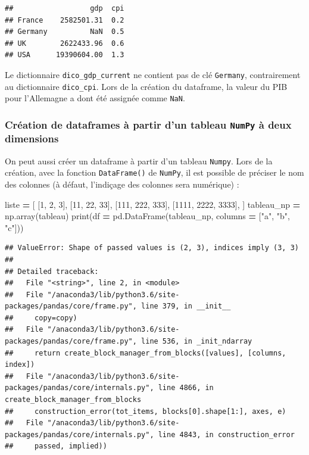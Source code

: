 \documentclass[12pt,]{book}
\newenvironment{Shaded}{\begin{snugshade}}{\end{snugshade}}
\newcommand{\DecValTok}[1]{\textcolor[rgb]{0.00,0.00,0.81}{#1}}
\newcommand{\StringTok}[1]{\textcolor[rgb]{0.31,0.60,0.02}{#1}}
\newcommand{\OperatorTok}[1]{\textcolor[rgb]{0.81,0.36,0.00}{\textbf{#1}}}
\newcommand{\BuiltInTok}[1]{#1}
\newcommand{\NormalTok}[1]{#1}
\numberwithin{equation}{section}
\numberwithin{countremarque}{section}
\let\BeginKnitrBlock\begin \let\EndKnitrBlock\end
\begin{document}
\begin{lstlisting}
##                  gdp  cpi
## France    2582501.31  0.2
## Germany          NaN  0.5
## UK        2622433.96  0.6
## USA      19390604.00  1.3
\end{lstlisting}

\BeginKnitrBlock{remarque}
Le dictionnaire \texttt{dico\_gdp\_current} ne contient pas de clé
\texttt{Germany}, contrairement au dictionnaire \texttt{dico\_cpi}. Lors
de la création du dataframe, la valeur du PIB pour l'Allemagne a dont
été assignée comme \texttt{NaN}.
\EndKnitrBlock{remarque}

\subsubsection{\texorpdfstring{Création de dataframes à partir d'un
tableau \texttt{NumPy} à deux
dimensions}{Création de dataframes à partir d'un tableau NumPy à deux dimensions}}\label{creation-de-dataframes-a-partir-dun-tableau-numpy-a-deux-dimensions}

On peut aussi créer un dataframe à partir d'un tableau \texttt{Numpy}.
Lors de la création, avec la fonction \texttt{DataFrame()} de
\texttt{NumPy}, il est possible de préciser le nom des colonnes (à
défaut, l'indiçage des colonnes sera numérique) :

\begin{Shaded}
\begin{Highlighting}[]
\NormalTok{liste }\OperatorTok{=}\NormalTok{ [}
\NormalTok{    [}\DecValTok{1}\NormalTok{, }\DecValTok{2}\NormalTok{, }\DecValTok{3}\NormalTok{],}
\NormalTok{    [}\DecValTok{11}\NormalTok{, }\DecValTok{22}\NormalTok{, }\DecValTok{33}\NormalTok{],}
\NormalTok{    [}\DecValTok{111}\NormalTok{, }\DecValTok{222}\NormalTok{, }\DecValTok{333}\NormalTok{],}
\NormalTok{    [}\DecValTok{1111}\NormalTok{, }\DecValTok{2222}\NormalTok{, }\DecValTok{3333}\NormalTok{],}
\NormalTok{]}
\NormalTok{tableau_np }\OperatorTok{=}\NormalTok{ np.array(tableau)}
\BuiltInTok{print}\NormalTok{(df }\OperatorTok{=}\NormalTok{ pd.DataFrame(tableau_np,}
\NormalTok{                  columns }\OperatorTok{=}\NormalTok{ [}\StringTok{"a"}\NormalTok{, }\StringTok{"b"}\NormalTok{, }\StringTok{"c"}\NormalTok{]))}
\end{Highlighting}
\end{Shaded}

\begin{lstlisting}
## ValueError: Shape of passed values is (2, 3), indices imply (3, 3)
## 
## Detailed traceback: 
##   File "<string>", line 2, in <module>
##   File "/anaconda3/lib/python3.6/site-packages/pandas/core/frame.py", line 379, in __init__
##     copy=copy)
##   File "/anaconda3/lib/python3.6/site-packages/pandas/core/frame.py", line 536, in _init_ndarray
##     return create_block_manager_from_blocks([values], [columns, index])
##   File "/anaconda3/lib/python3.6/site-packages/pandas/core/internals.py", line 4866, in create_block_manager_from_blocks
##     construction_error(tot_items, blocks[0].shape[1:], axes, e)
##   File "/anaconda3/lib/python3.6/site-packages/pandas/core/internals.py", line 4843, in construction_error
##     passed, implied))
\end{lstlisting}
\end{document}
